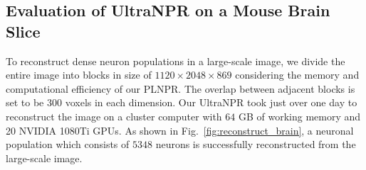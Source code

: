 
\subsection{Evaluation of UltraNPR on a Mouse Brain Slice}
\label{sec:exp_UltraNPR}

To reconstruct dense neuron populations in a large-scale image, we divide the entire image into blocks in size of $1120\times 2048\times 869$ considering the memory and computational efficiency of our PLNPR.
The overlap between adjacent blocks is set to be $300$ voxels in each dimension. 
%
Our UltraNPR took just over one day  to reconstruct the image on a cluster computer with $64$ GB of working memory and 20 NVIDIA 1080Ti GPUs.
%
As shown in Fig.~\ref{fig:reconstruct_brain}, a neuronal population which consists of $5348$ neurons is successfully reconstructed from the large-scale image.



